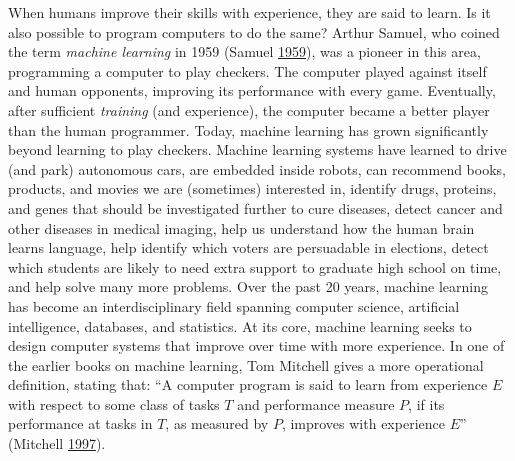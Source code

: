 \documentclass[]{krantz}
\begin{document}
When humans improve their skills with experience, they are said to
learn. Is it also possible to program computers to do the same? Arthur
Samuel, who coined the term \emph{machine learning} in 1959 (Samuel
\protect\hyperlink{ref-samuel1959some}{1959}), was a pioneer in this
area, programming a computer to play checkers. The computer played
against itself and human opponents, improving its performance with every
game. Eventually, after sufficient \emph{training} (and experience), the
computer became a better player than the human programmer. Today,
machine learning has grown significantly beyond learning to play
checkers. Machine learning systems have learned to drive (and park)
autonomous cars, are embedded inside robots, can recommend books,
products, and movies we are (sometimes) interested in, identify drugs,
proteins, and genes that should be investigated further to cure
diseases, detect cancer and other diseases in medical imaging, help us
understand how the human brain learns language, help identify which
voters are persuadable in elections, detect which students are likely to
need extra support to graduate high school on time, and help solve many
more problems. Over the past 20 years, machine learning has become an
interdisciplinary field spanning computer science, artificial
intelligence, databases, and statistics. At its core, machine learning
seeks to design computer systems that improve over time with more
experience. In one of the earlier books on machine learning, Tom
Mitchell gives a more operational definition, stating that: ``A computer
program is said to learn from experience \(E\) with respect to some
class of tasks \(T\) and performance measure \(P\), if its performance
at tasks in \(T\), as measured by \(P\), improves with experience
\(E\)'' (Mitchell \protect\hyperlink{ref-mitchell1997machine}{1997}).

\enlargethispage{6pt}
\end{document}
